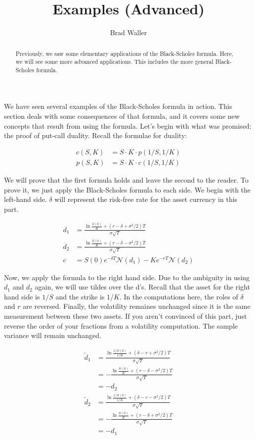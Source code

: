 \documentclass{ximera}
\author{Brad Waller}
\title{Examples (Advanced)}
\begin{document}
\begin{abstract}
Previously, we saw some elementary applications of the Black-Scholes formula. Here, we will see some more advanced applications. This includes the more general Black-Scholes formula.
\end{abstract}
\maketitle

We have seen several examples of the Black-Scholes formula in action. This section deals with some consequences of that formula, and it covers some new concepts that result from using the formula. Let's begin with what was promised: the proof of put-call duality. Recall the formulae for duality:

\begin{align*}
c(S,K) 	&=S\cdot K\cdot p(1/S,1/K)\\
p(S,K)		&=S\cdot K\cdot c(1/S, 1/K)
\end{align*}

We will prove that the first formula holds and leave the second to the reader. To prove it, we just apply the Black-Scholes formula to each side. We begin with the left-hand side. $\delta$ will represent the risk-free rate for the asset currency in this part.

\begin{align*}
d_1 		&=\frac{\ln\frac{S(0)}{K}+(r-\delta+\sigma^2/2)T}{\sigma\sqrt{T}}\\
d_2 		&=\frac{\ln\frac{S(0)}{K}+(r-\delta-\sigma^2/2)T}{\sigma\sqrt{T}}\\
c 		&=S(0)e^{-\delta T}\mathcal{N}(d_1)-Ke^{-rT}\mathcal{N}(d_2)
\end{align*}

Now, we apply the formula to the right hand side. Due to the ambiguity in using $d_1$ and $d_2$ again, we will use tildes over the d's. Recall that the asset for the right hand side is $1/S$ and the strike is $1/K$. In the computations here, the roles of $\delta$ and $r$ are reversed. Finally, the volatility remaines unchanged since it is the same measurement between these two assets. If you aren't convinced of this part, just reverse the order of your fractions from a volatility computation. The sample variance will remain unchanged.

\begin{align*}
\tilde{d}_1 				&=\frac{\ln\frac{1/S(0)}{1/K}+(\delta-r+\sigma^2/2)T}{\sigma\sqrt{T}}\\
					&=-\frac{\ln\frac{S(0)}{K}+(r-\delta-\sigma^2/2)T}{\sigma\sqrt{T}}\\
					&=-d_2\\
\tilde{d}_2 				&=\frac{\ln\frac{1/S(0)}{1/K}+(\delta-r-\sigma^2/2)T}{\sigma\sqrt{T}}\\
					&=-\frac{\ln\frac{S(0)}{K}+(r-\delta+\sigma^2/2)T}{\sigma\sqrt{T}}\\
					&=-d_1
\end{align*}
\end{document}
